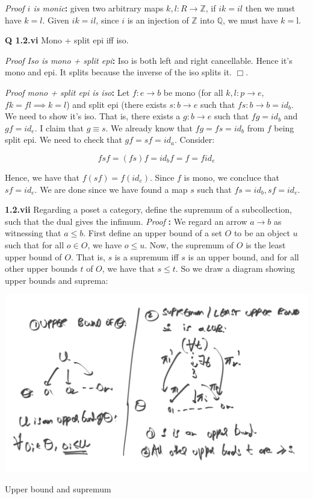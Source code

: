 \documentclass[11pt]{book}
\newcommand{\Z}{\ensuremath{\mathbb{Z}}}
\newcommand{\Q}{\ensuremath{\mathbb{Q}}}
\def\qed{$\Box$}
\newcommand{\beginproof}[1][]{\emph{Proof #1}\textbf{:} }
\newcommand{\question}[1]{\textbf{#1}}
\begin{document}
\beginproof[$i$ is monic]
given two arbitrary maps $k, l: R \rightarrow \Z$, if $ik = il$ then we must have $k = l$. Given $ik = il$, since $i$
is an injection of $\Z$ into $\Q$, we must have $k = $l.

\question{Q 1.2.vi} Mono + split epi iff iso.


\beginproof[Iso is mono + split epi]
Iso is both left and right cancellable. Hence it's mono and epi. It splits because the inverse of the iso splits it. \qed.


\beginproof[mono + split epi is iso]
Let $f: e \rightarrow b$ be mono (for all $k, l: p \to e$, $fk = fl \implies k = l$)
and split epi (there exists $s: b \rightarrow e$ such that $fs: b \rightarrow b = id_b$.
We need to show it's iso. That is, there exists a $g: b \rightarrow e$ such that $fg = id_b$ and $gf = id_e$.
I claim that $g \equiv s$. We already know that $fg = fs = id_b$ from $f$ being split epi. We need to 
check that $gf = sf = id_a$. Consider:

$$fsf = (fs)f = id_b f = f = f id_e$$

Hence, we have that $f(sf) = f(id_e)$. Since $f$ is mono, we concluce that $sf = id_e$. We are done 
since we have found a map $s$ such that $fs = id_b, sf = id_e$.


\question{1.2.vii} Regarding a poset a category, define the supremum of a subcollection, such that the dual gives the infimum.
\beginproof We regard an arrow $a \to b$ as witnessing that $a \leq b$. First define an upper bound of a set $O$
to be an object $u$ such that for all $o \in O$, we have $o \leq u$. Now, the supremum of $O$ is the least upper bound
of $O$. That is, $s$ is a supremum iff $s$ is an upper bound, and for all other upper bounds $t$ of $O$, we have that $s \leq t$.
So we draw a diagram showing upper bounds and suprema:

\begin{minipage}{\textwidth}
\includegraphics[width=\textwidth]{ch1/sup.png}
    \begin{center}Upper bound and supremum\end{center}
\end{minipage}
\end{document}

